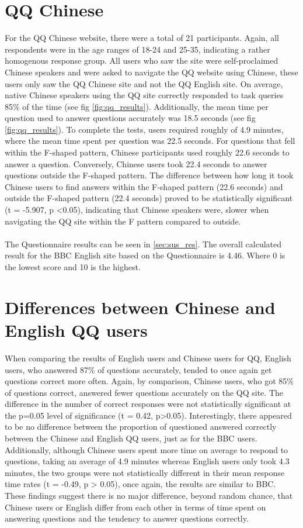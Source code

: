 \section{QQ Chinese}
For the QQ Chinese website, there were a total of 21 participants. Again, all respondents were in the age ranges of 18-24 and 25-35, indicating a rather homogenous response group. All users who saw the site were self-proclaimed Chinese speakers and were asked to navigate the QQ website using Chinese, these users only saw the QQ Chinese site and not the QQ English site. On average, native Chinese speakers using the QQ site correctly responded to task queries 85\% of the time (see fig \ref{fig:qq_results}). Additionally, the mean time per question used to answer questions accurately was 18.5 seconds (see fig \ref{fig:qq_results}). To complete the tests, users required roughly of 4.9 minutes, where the mean time spent per question was 22.5 seconds. For questions that fell within the F-shaped pattern, Chinese participants used roughly 22.6 seconds to answer a question. Conversely, Chinese users took 22.4 seconds to answer questions outside the F-shaped pattern. The difference between how long it took Chinese users to find answers within the F-shaped pattern (22.6 seconds) and outside the F-shaped pattern (22.4 seconds) proved to be statistically significant (t = -5.907, p <0.05), indicating that Chinese speakers were, slower when navigating the QQ site within the F pattern compared to outside. 
\\\\
The Questionnaire results can be seen in \ref{sec:sus_res}. The overall calculated result for the BBC English site based on the Questionnaire is 4.46. Where 0 is the lowest score and 10 is the highest.

\section{Differences between Chinese and English QQ users}
When comparing the results of English users and Chinese users for QQ, English users, who answered 87\% of questions accurately, tended to once again get questions correct more often. Again, by comparison, Chinese users, who got 85\% of questions correct, answered fewer questions accurately on the QQ site. The difference in the number of correct responses were not statistically significant at the p=0.05 level of significance (t = 0.42, p>0.05). Interestingly, there appeared to be no difference between the proportion of questioned answered correctly between the Chinese and English QQ users, just as for the BBC users. Additionally, although Chinese users spent more time on average to respond to questions, taking an average of 4.9 minutes whereas English users only took 4.3 minutes, the two groups were not statistically different in their mean response time rates (t = -0.49, p > 0.05), once again, the results are similar to BBC. These findings suggest there is no major difference, beyond random chance, that Chinese users or English differ from each other in terms of time spent on answering questions and the tendency to answer questions correctly.

